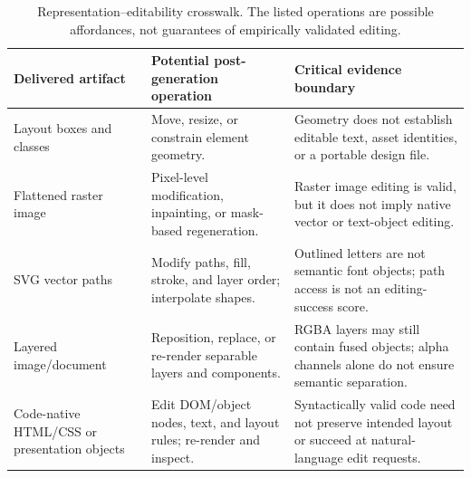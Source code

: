 \begin{table}[t]
\centering
\caption{Representation--editability crosswalk.
The listed operations are possible affordances, not guarantees of empirically validated editing.}
\label{tab:representation}
\small
\begin{tabularx}{\textwidth}{@{}p{}XX@{}}
\toprule
\textbf{Delivered artifact} & \textbf{Potential post-generation operation} & \textbf{Critical evidence boundary} \\
\midrule
Layout boxes and classes & Move, resize, or constrain element geometry. & Geometry does not establish editable text, asset identities, or a portable design file. \\
Flattened raster image & Pixel-level modification, inpainting, or mask-based regeneration. & Raster image editing is valid, but it does not imply native vector or text-object editing. \\
SVG vector paths & Modify paths, fill, stroke, and layer order; interpolate shapes. & Outlined letters are not semantic font objects; path access is not an editing-success score. \\
Layered image/document & Reposition, replace, or re-render separable layers and components. & RGBA layers may still contain fused objects; alpha channels alone do not ensure semantic separation. \\
Code-native HTML/CSS or presentation objects & Edit DOM/object nodes, text, and layout rules; re-render and inspect. & Syntactically valid code need not preserve intended layout or succeed at natural-language edit requests. \\
\bottomrule
\end{tabularx}
\end{table}
